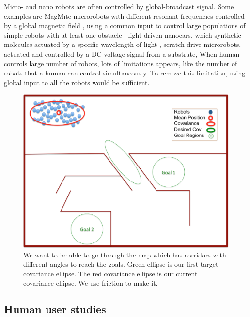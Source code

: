 \documentclass[letterpaper, 10 pt, conference]{ieeeconf}
\begin{document}
Micro- and nano robots are often controlled by global-broadcast signal. Some examples are MagMite microrobots with different resonant frequencies controlled by a global magnetic field \cite{Frutiger2008},
using a common input to control large populations of simple robots with at least one obstacle \cite{AaronManipulation2013}, light-driven nanocars, which synthetic molecules actuated by a specific wavelength of light \cite{TourNanocar2012}, scratch-drive microrobots, actuated and controlled by a DC voltage signal from a substrate\cite{Donald2006,Donald2008}, When human controls large number of robots, lots of limitations appears, like the number of robots that a human can control simultaneously. To remove this limitation, using global input to all the robots would be sufficient. 
\begin{figure}[h]
\begin{center}
\includegraphics[width=\columnwidth]{HardMap.png}
\caption{We want to be able to go through the map which has corridors with different angles to reach the goals. Green ellipse is our first target covariance ellipse. The red covariance ellipse is our current covariance ellipse. We use friction to make it.}
\label{fig:covariance}
\end{center}
\end{figure} 
\subsection{Human user studies}
\end{document}
